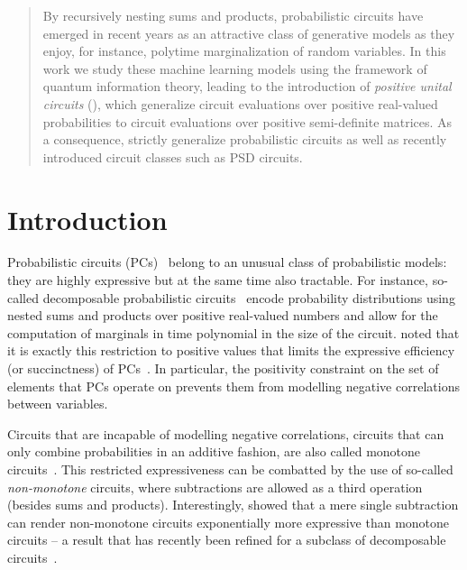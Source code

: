 





\begin{abstract}
	By recursively nesting sums and products, probabilistic circuits have emerged in recent years as an attractive class of generative models as they enjoy, for instance, polytime marginalization of random variables.
	In this work we study these machine learning models using the framework of quantum information theory, leading to the introduction of \textit{positive unital circuits} (\puncs),
	which generalize circuit evaluations over positive real-valued probabilities to circuit evaluations over positive semi-definite matrices.
	As a consequence, \puncs strictly generalize probabilistic circuits as well as recently introduced circuit classes such as PSD circuits.
\end{abstract}



\section{Introduction}



Probabilistic circuits (PCs)~\citep{darwiche2003differential,poon2011sum} belong to an unusual class of probabilistic models: they are highly expressive but at the same time also tractable.
For instance, so-called decomposable probabilistic circuits~\citep{darwiche2001decomposable} encode probability distributions using nested sums and products over positive real-valued numbers and allow for the computation of marginals in time polynomial in the size of the circuit.
\citet{zhang2020relationship} noted that it is exactly this restriction to positive values that limits the expressive efficiency (or succinctness) of PCs~\citep{martens2014expressive,decolnet2021compilation}. In particular, the positivity constraint on the set of elements that PCs operate on prevents them from modelling negative correlations between variables.

Circuits that are incapable of modelling negative correlations, \ie circuits that can only combine probabilities in an additive fashion, are also called monotone circuits~\citep{shpilka2010arithmetic}.
This restricted expressiveness can be combatted by the use of so-called \textit{non-monotone} circuits, where subtractions are allowed as a third operation (besides sums and products). Interestingly, \citet{valiant1979negation} showed that a mere single subtraction can render non-monotone circuits exponentially more expressive than monotone circuits -- a result that has recently been refined for a subclass of decomposable circuits~\citep{loconte2025sum}.

